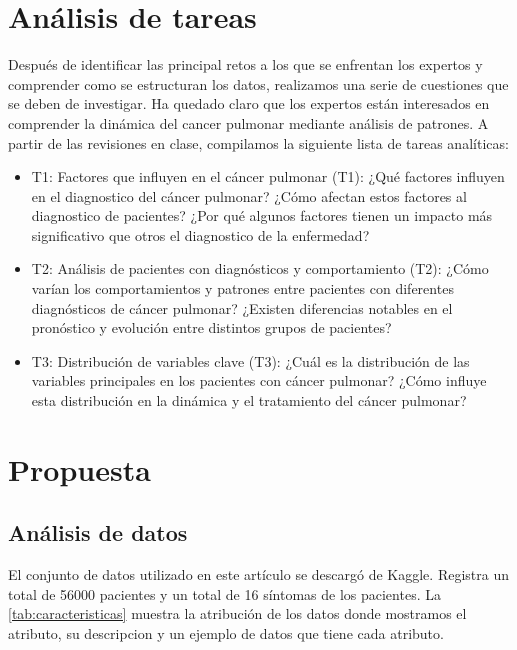 \documentclass[10pt,journal,compsoc]{IEEEtran}
\begin{document}
\section{Análisis de tareas}
\label{sec:analiticas}
Después de identificar las principal retos a los que se enfrentan los expertos y comprender como se estructuran los datos, realizamos una serie de cuestiones que se deben de investigar. Ha quedado claro que los expertos están interesados en comprender la dinámica del cancer pulmonar mediante análisis de patrones. A partir de las revisiones en clase, compilamos la siguiente lista de tareas analíticas:
\begin{itemize}
\item T1: Factores que influyen en el cáncer pulmonar (T1): ¿Qué factores influyen en el diagnostico del cáncer pulmonar? ¿Cómo afectan estos factores al diagnostico de pacientes? ¿Por qué algunos factores tienen un impacto más significativo que otros el diagnostico de la enfermedad?
\item T2: Análisis de pacientes con diagnósticos y comportamiento (T2): ¿Cómo varían los comportamientos y patrones entre pacientes con diferentes diagnósticos de cáncer pulmonar? ¿Existen diferencias notables en el pronóstico y evolución entre distintos grupos de pacientes?
\item T3: Distribución de variables clave (T3): ¿Cuál es la distribución de las variables principales en los pacientes con cáncer pulmonar? ¿Cómo influye esta distribución en la dinámica y el tratamiento del cáncer pulmonar?
\end{itemize}

\section{Propuesta}

\subsection{Análisis de datos}
El conjunto de datos utilizado en este artículo se descargó de Kaggle. Registra un total de 56000 pacientes y un total de 16 síntomas de los pacientes. La \autoref{tab:caracteristicas}   muestra la atribución de los datos donde mostramos el atributo, su descripcion y un ejemplo de datos que tiene cada atributo.
\end{document}
